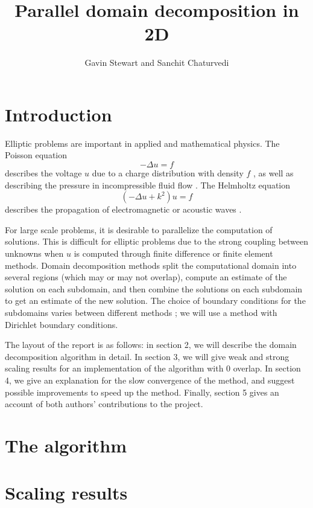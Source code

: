 \documentclass{article}
\title{Parallel domain decomposition in 2D}
\author{Gavin Stewart and Sanchit Chaturvedi}
\begin{document}
	\maketitle
	
	\section{Introduction}
	 
	Elliptic problems are important in applied and mathematical physics.  The Poisson equation 
	\begin{equation}
		-\Delta u = f
	\end{equation} describes the voltage \(u\) due to a charge distribution with density \(f\)%
	, as well as describing the pressure in incompressible fluid flow \cite{Marshall97}. The Helmholtz equation
	\begin{equation}
		(-\Delta u + k^2)u = f
	\end{equation} 
	describes the propagation of electromagnetic or acoustic waves \cite{Fairweather03}.
	
	For large scale problems, it is desirable to parallelize the computation of solutions.  This is difficult for elliptic problems due to the strong coupling between unknowns when \(u\) is computed through finite difference or finite element methods.  Domain decomposition methods split the computational domain into several regions (which may or may not overlap), compute an estimate of the solution on each  subdomain, and then combine the solutions on each subdomain to get an estimate of the new solution.  The choice of boundary conditions for the subdomains varies between different methods%
	; we will use a method with Dirichlet boundary conditions.
	
	The layout of the report is as follows: in section 2, we will describe the domain decomposition algorithm in detail.  In section 3, we will give weak and strong scaling results for an implementation of the algorithm with \(0\) overlap.  In section 4, we give an explanation for the slow convergence of the method, and suggest possible improvements to speed up the method.  Finally, section 5 gives an account of both authors' contributions to the project.
	
	\section{The algorithm}
	
	\section{Scaling results}
	
\end{document}
